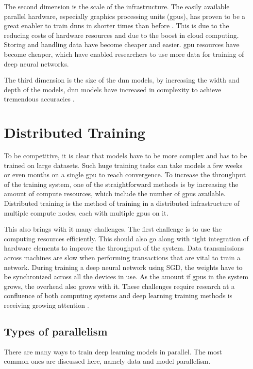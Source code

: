 The second dimension is the scale of the infrastructure. The easily available parallel hardware, especially graphics processing units (\acrshort{gpu}s), has proven to be a great enabler to train \acrshort{dnn}s in shorter times than before \cite{Zhang2017Poseidon:Clusters}. This is due to the reducing costs of hardware resources and due to the boost in cloud computing. Storing and handling data have become cheaper and easier. \acrshort{gpu} resources have become cheaper, which have enabled researchers to use more data for training of deep neural networks. 

The third dimension is the size of the \acrshort{dnn} models, by increasing the width and depth of the models, \acrshort{dnn} models have increased in complexity to achieve tremendous accuracies \cite{Dean2012LargeNetworks}. 

\section{Distributed Training}
To be competitive, it is clear that models have to be more complex and has to be trained on large datasets. Such huge training tasks can take models a few weeks or even months on a single \acrshort{gpu} to reach convergence. To increase the throughput of the training system, one of the straightforward  methods is by increasing the amount of compute resources, which include the number of \acrshort{gpu}s available. Distributed training is the method of training in a distributed infrastructure of multiple compute nodes, each with multiple \acrshort{gpu}s on it\cite{Langer2020DistributedPerspective}. 

This also brings with it many challenges. The first challenge is to use the computing resources efficiently. This should also go along with tight integration of hardware elements to improve the throughput of the system. Data transmissions across machines are slow when performing transactions that are vital to train a network. During training a deep neural network using SGD, the weights have to be synchronized across all the devices in use. As the amount if \acrshort{gpu}s in the system grows, the overhead also grows with it. These challenges require research at a confluence of both computing systems and deep learning training methods is receiving growing attention \cite{Xiao2018Gandiva:Learning, Mai2020KungFu:Adaptive, Chilimbi2014ProjectSystem, Cui2016GeePS:Server, Peng2018Optimus:Clusters}.

\subsection{Types of parallelism}
There are many ways to train deep learning models in parallel. The most common ones are discussed here, namely data and model parallelism.


